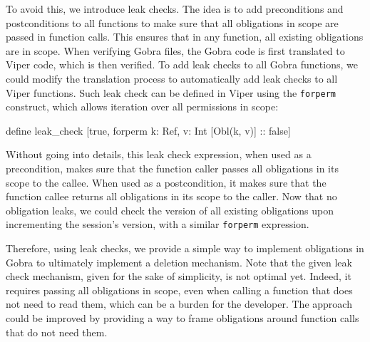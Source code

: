 To avoid this, we introduce leak checks.
The idea is to add preconditions and postconditions to all functions to make sure that all obligations in scope are passed in function calls. This ensures that in any function, all existing obligations are in scope.
When verifying Gobra files, the Gobra code is first translated to Viper code, which is then verified.
To add leak checks to all Gobra functions, we could modify the translation process to automatically add leak checks to all Viper functions.
Such leak check can be defined in Viper using the \texttt{forperm} construct, which allows iteration over all permissions in scope:
\begin{gobra}
define leak_check [true, forperm k: Ref, v: Int [Obl(k, v)] :: false]
\end{gobra}
Without going into details, this leak check expression, when used as a precondition, makes sure that the function caller passes all obligations in its scope to the callee. When used as a postcondition, it makes sure that the function callee returns all obligations in its scope to the caller.
Now that no obligation leaks, we could check the version of all existing obligations upon incrementing the session's version, with a similar \texttt{forperm} expression.

Therefore, using leak checks, we provide a simple way to implement obligations in Gobra to ultimately implement a deletion mechanism.
Note that the given leak check mechanism, given for the sake of simplicity, is not optimal yet. Indeed, it requires passing all obligations in scope, even when calling a function that does not need to read them, which can be a burden for the developer. The approach could be improved by providing a way to frame obligations around function calls that do not need them.